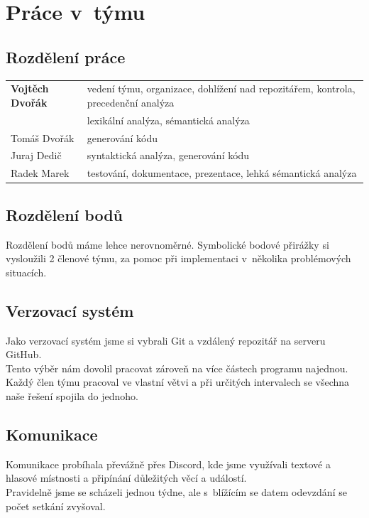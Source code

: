 \documentclass[11pt]{article}
\begin{document}
    \section{Práce v~týmu}
    
    \subsection{Rozdělení práce}
        \begin{tabular}{l  l}
                \textbf{Vojtěch Dvořák} & vedení týmu, organizace, dohlížení nad repozitářem, kontrola,             precedenční analýza  \\
                        & lexikální analýza, sémantická analýza\\
                Tomáš Dvořák & generování kódu   \\
                Juraj Dedič & syntaktická analýza, generování kódu \\
                Radek Marek & testování, dokumentace, prezentace, lehká sémantická analýza 
        \end{tabular}
            
    \subsection{Rozdělení bodů}
        Rozdělení bodů máme lehce nerovnoměrné. Symbolické bodové přirážky si vysloužili 2 členové týmu, za pomoc při implementaci v~několika problémových situacích.
    
    \subsection{Verzovací systém}
        Jako verzovací systém jsme si vybrali Git a vzdálený repozitář na serveru GitHub. \\
    	\indent Tento výběr nám dovolil pracovat zároveň na více částech programu najednou. Každý člen týmu pracoval ve vlastní větvi a při určitých intervalech se všechna naše řešení spojila do jednoho. 

    \subsection{Komunikace}
        Komunikace probíhala převážně přes Discord, kde jsme využívali textové a hlasové místnosti a připínání důležitých věcí a událostí. \\
    	\indent Pravidelně jsme se scházeli jednou týdne, ale s~blížícím se datem odevzdání se počet setkání zvyšoval. 
    	
\end{document}
